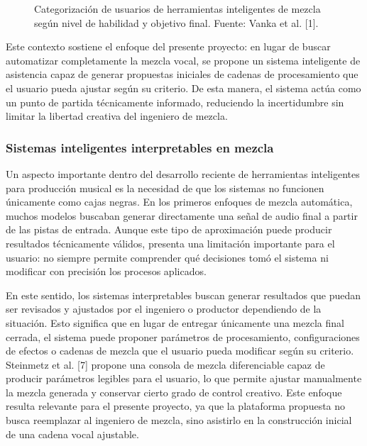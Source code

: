 \documentclass[12pt]{article}
\begin{document}
\begin{figure}[h!]
\centering
\caption{Categorización de usuarios de herramientas inteligentes de mezcla según nivel de habilidad y objetivo final. Fuente: Vanka et al. [1].}
\label{fig:fig5}
\end{figure}

Este contexto sostiene el enfoque del presente proyecto: en lugar de buscar automatizar completamente la mezcla vocal, se propone un sistema inteligente de asistencia capaz de generar propuestas iniciales de cadenas de procesamiento que el usuario pueda ajustar según su criterio. De esta manera, el sistema actúa como un punto de partida técnicamente informado, reduciendo la incertidumbre sin limitar la libertad creativa del ingeniero de mezcla.

\subsubsection*{Sistemas inteligentes interpretables en mezcla}

Un aspecto importante dentro del desarrollo reciente de herramientas inteligentes para producción musical es la necesidad de que los sistemas no funcionen únicamente como cajas negras. En los primeros enfoques de mezcla automática, muchos modelos buscaban generar directamente una señal de audio final a partir de las pistas de entrada. Aunque este tipo de aproximación puede producir resultados técnicamente válidos, presenta una limitación importante para el usuario: no siempre permite comprender qué decisiones tomó el sistema ni modificar con precisión los procesos aplicados.

En este sentido, los sistemas interpretables buscan generar resultados que puedan ser revisados y ajustados por el ingeniero o productor dependiendo de la situación. Esto significa que en lugar de entregar únicamente una mezcla final cerrada, el sistema puede proponer parámetros de procesamiento, configuraciones de efectos o cadenas de mezcla que el usuario pueda modificar según su criterio. Steinmetz et al. [7] propone una consola de mezcla diferenciable capaz de producir parámetros legibles para el usuario, lo que permite ajustar manualmente la mezcla generada y conservar cierto grado de control creativo. Este enfoque resulta relevante para el presente proyecto, ya que la plataforma propuesta no busca reemplazar al ingeniero de mezcla, sino asistirlo en la construcción inicial de una cadena vocal ajustable.
\end{document}

